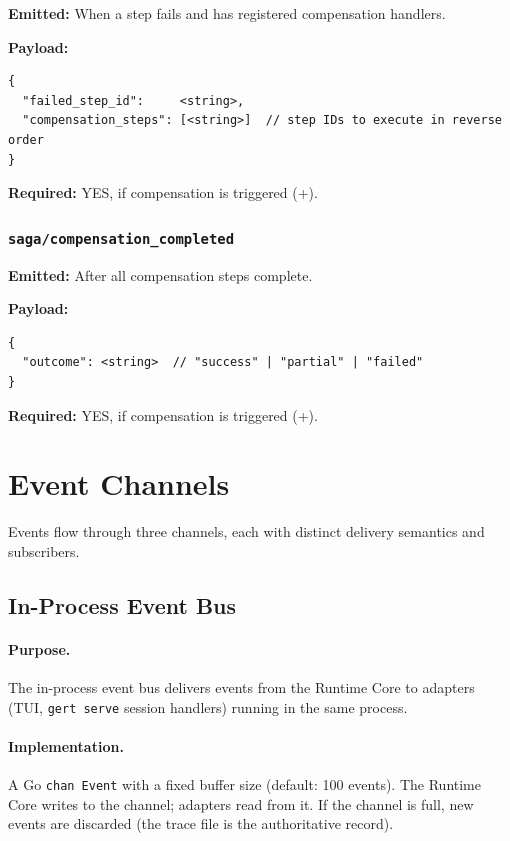\textbf{Emitted:} When a step fails and has registered compensation handlers.

\textbf{Payload:}
\begin{verbatim}
{
  "failed_step_id":     <string>,
  "compensation_steps": [<string>]  // step IDs to execute in reverse order
}
\end{verbatim}

\textbf{Required:} YES, if compensation is triggered (+).


\subsubsection{\texttt{saga/compensation\_completed}}

\textbf{Emitted:} After all compensation steps complete.

\textbf{Payload:}
\begin{verbatim}
{
  "outcome": <string>  // "success" | "partial" | "failed"
}
\end{verbatim}

\textbf{Required:} YES, if compensation is triggered (+).

\section{Event Channels}

Events flow through three channels, each with distinct delivery semantics and subscribers.

\subsection{In-Process Event Bus}

\paragraph{Purpose.} The in-process event bus delivers events from the Runtime Core to adapters (TUI, \texttt{gert serve} session handlers) running in the same process.

\paragraph{Implementation.} A Go \texttt{chan Event} with a fixed buffer size (default: 100 events). The Runtime Core writes to the channel; adapters read from it. If the channel is full, new events are discarded (the trace file is the authoritative record).

